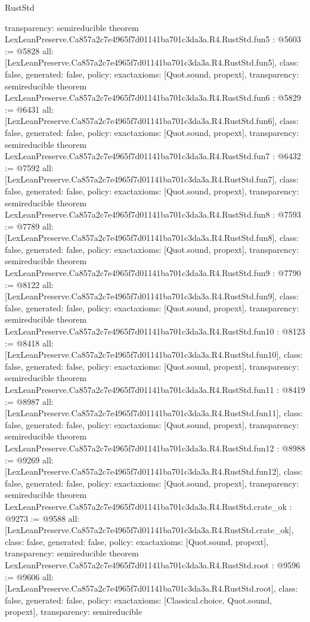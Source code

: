 \begin{lexlean}{RustStd}
\begin{coremodule}
{  transparency: semireducible
}
theorem LexLeanPreserve.Ca857a2c7e4965f7d01141ba701c3da3a.R4.RustStd.fun5 : @5603 := @5828 {
  all: [LexLeanPreserve.Ca857a2c7e4965f7d01141ba701c3da3a.R4.RustStd.fun5],
  class: false,
  generated: false,
  policy: exact{axioms: [Quot.sound, propext]},
  transparency: semireducible
}
theorem LexLeanPreserve.Ca857a2c7e4965f7d01141ba701c3da3a.R4.RustStd.fun6 : @5829 := @6431 {
  all: [LexLeanPreserve.Ca857a2c7e4965f7d01141ba701c3da3a.R4.RustStd.fun6],
  class: false,
  generated: false,
  policy: exact{axioms: [Quot.sound, propext]},
  transparency: semireducible
}
theorem LexLeanPreserve.Ca857a2c7e4965f7d01141ba701c3da3a.R4.RustStd.fun7 : @6432 := @7592 {
  all: [LexLeanPreserve.Ca857a2c7e4965f7d01141ba701c3da3a.R4.RustStd.fun7],
  class: false,
  generated: false,
  policy: exact{axioms: [Quot.sound, propext]},
  transparency: semireducible
}
theorem LexLeanPreserve.Ca857a2c7e4965f7d01141ba701c3da3a.R4.RustStd.fun8 : @7593 := @7789 {
  all: [LexLeanPreserve.Ca857a2c7e4965f7d01141ba701c3da3a.R4.RustStd.fun8],
  class: false,
  generated: false,
  policy: exact{axioms: [Quot.sound, propext]},
  transparency: semireducible
}
theorem LexLeanPreserve.Ca857a2c7e4965f7d01141ba701c3da3a.R4.RustStd.fun9 : @7790 := @8122 {
  all: [LexLeanPreserve.Ca857a2c7e4965f7d01141ba701c3da3a.R4.RustStd.fun9],
  class: false,
  generated: false,
  policy: exact{axioms: [Quot.sound, propext]},
  transparency: semireducible
}
theorem LexLeanPreserve.Ca857a2c7e4965f7d01141ba701c3da3a.R4.RustStd.fun10 : @8123 := @8418 {
  all: [LexLeanPreserve.Ca857a2c7e4965f7d01141ba701c3da3a.R4.RustStd.fun10],
  class: false,
  generated: false,
  policy: exact{axioms: [Quot.sound, propext]},
  transparency: semireducible
}
theorem LexLeanPreserve.Ca857a2c7e4965f7d01141ba701c3da3a.R4.RustStd.fun11 : @8419 := @8987 {
  all: [LexLeanPreserve.Ca857a2c7e4965f7d01141ba701c3da3a.R4.RustStd.fun11],
  class: false,
  generated: false,
  policy: exact{axioms: [Quot.sound, propext]},
  transparency: semireducible
}
theorem LexLeanPreserve.Ca857a2c7e4965f7d01141ba701c3da3a.R4.RustStd.fun12 : @8988 := @9269 {
  all: [LexLeanPreserve.Ca857a2c7e4965f7d01141ba701c3da3a.R4.RustStd.fun12],
  class: false,
  generated: false,
  policy: exact{axioms: [Quot.sound, propext]},
  transparency: semireducible
}
theorem LexLeanPreserve.Ca857a2c7e4965f7d01141ba701c3da3a.R4.RustStd.crate_ok : @9273 := @9588 {
  all: [LexLeanPreserve.Ca857a2c7e4965f7d01141ba701c3da3a.R4.RustStd.crate_ok],
  class: false,
  generated: false,
  policy: exact{axioms: [Quot.sound, propext]},
  transparency: semireducible
}
theorem LexLeanPreserve.Ca857a2c7e4965f7d01141ba701c3da3a.R4.RustStd.root : @9596 := @9606 {
  all: [LexLeanPreserve.Ca857a2c7e4965f7d01141ba701c3da3a.R4.RustStd.root],
  class: false,
  generated: false,
  policy: exact{axioms: [Classical.choice, Quot.sound, propext]},
  transparency: semireducible
}


\end{coremodule}
\end{lexlean}
